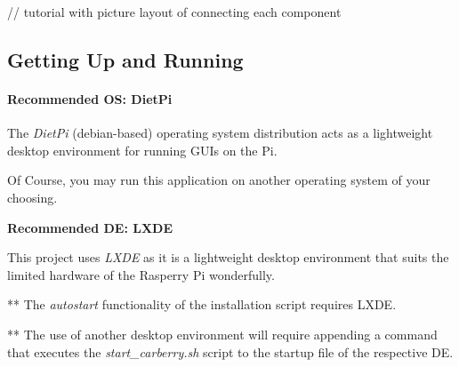 \documentclass{article}
\begin{document}
// tutorial with picture layout of connecting each component

\hypertarget{getting-up-and-running}{%
\subsection{Getting Up and Running}\label{getting-up-and-running}}

\hypertarget{recommended-os-dietpi}{%
\paragraph{Recommended OS: DietPi}\label{recommended-os-dietpi}}

The \emph{DietPi} (debian-based) operating system distribution acts as a
lightweight desktop environment for running GUIs on the Pi.

Of Course, you may run this application on another operating system of
your choosing.

\textbf{Recommended DE: LXDE}

This project uses \emph{LXDE} as it is a lightweight desktop environment
that suits the limited hardware of the Rasperry Pi wonderfully.

** The \emph{autostart} functionality of the installation script
requires LXDE.

** The use of another desktop environment will require appending a
command that executes the \emph{start\_carberry.sh} script to the
startup file of the respective DE.
\end{document}
